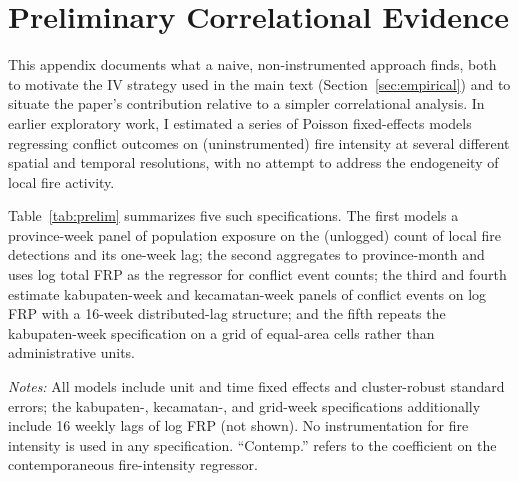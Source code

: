 \documentclass[12pt]{article}
\begin{document}
\section{Preliminary Correlational Evidence}
\label{sec:preliminary}

This appendix documents what a naive, non-instrumented approach finds, both to motivate the IV strategy used in the main text (Section~\ref{sec:empirical}) and to situate the paper's contribution relative to a simpler correlational analysis. In earlier exploratory work, I estimated a series of Poisson fixed-effects models regressing conflict outcomes on (uninstrumented) fire intensity at several different spatial and temporal resolutions, with no attempt to address the endogeneity of local fire activity.

Table~\ref{tab:prelim} summarizes five such specifications. The first models a province-week panel of population exposure on the (unlogged) count of local fire detections and its one-week lag; the second aggregates to province-month and uses log total FRP as the regressor for conflict event counts; the third and fourth estimate kabupaten-week and kecamatan-week panels of conflict events on log FRP with a 16-week distributed-lag structure; and the fifth repeats the kabupaten-week specification on a grid of equal-area cells rather than administrative units.

\begin{table}[H]
\centering
\caption{Preliminary Poisson FE models, uninstrumented fire intensity}
\label{tab:prelim}
\begin{minipage}{0.95\textwidth}
\vspace{4pt}
\footnotesize \emph{Notes:} All models include unit and time fixed effects and cluster-robust standard errors; the kabupaten-, kecamatan-, and grid-week specifications additionally include 16 weekly lags of log FRP (not shown). No instrumentation for fire intensity is used in any specification. ``Contemp.'' refers to the coefficient on the contemporaneous fire-intensity regressor.
\end{minipage}
\end{table}
\end{document}
